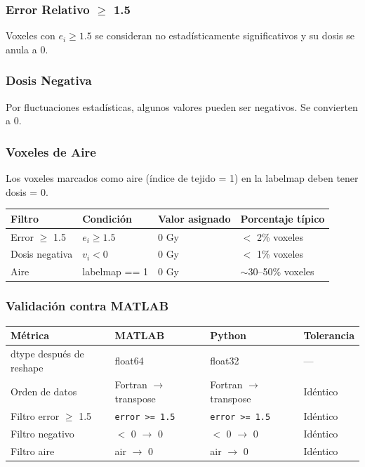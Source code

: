 \documentclass[12pt,a4paper]{article}
\begin{document}
\subsubsection{Error Relativo $\geq$ 1.5}

Voxeles con $e_i \geq 1.5$ se consideran no estadísticamente significativos y su dosis se anula a 0.

\subsubsection{Dosis Negativa}

Por fluctuaciones estadísticas, algunos valores pueden ser negativos. Se convierten a 0.

\subsubsection{Voxeles de Aire}

Los voxeles marcados como aire (índice de tejido = 1) en la labelmap deben tener dosis = 0.

\begin{tabular}{p{3.5cm} p{4cm} p{3cm} p{4cm}}
\toprule
\textbf{Filtro} & \textbf{Condición} & \textbf{Valor asignado} & \textbf{Porcentaje típico} \\
\midrule
Error $\geq$ 1.5 & $e_i \geq 1.5$ & 0 Gy & $<$ 2\% voxeles \\
Dosis negativa & $v_i < 0$ & 0 Gy & $<$ 1\% voxeles \\
Aire & labelmap == 1 & 0 Gy & $\sim$30--50\% voxeles \\
\bottomrule
\end{tabular}

\subsubsection{Validación contra MATLAB}

\begin{tabular}{p{5cm} p{2.5cm} p{2.5cm} p{2.5cm}}
\toprule
\textbf{Métrica} & \textbf{MATLAB} & \textbf{Python} & \textbf{Tolerancia} \\
\midrule
dtype después de reshape & float64 & float32 & --- \\
Orden de datos & Fortran $\to$ transpose & Fortran $\to$ transpose & Idéntico \\
Filtro error $\geq$ 1.5 & \texttt{error >= 1.5} & \texttt{error >= 1.5} & Idéntico \\
Filtro negativo & $<$ 0 $\to$ 0 & $<$ 0 $\to$ 0 & Idéntico \\
Filtro aire & air $\to$ 0 & air $\to$ 0 & Idéntico \\
\bottomrule
\end{tabular}
\end{document}
